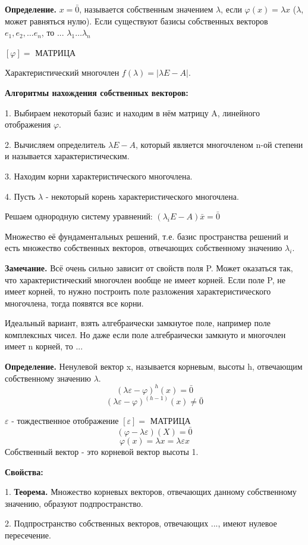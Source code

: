 \documentclass{article}
\begin{document}
{\bf Определение.} $x=\bar{0}$, называется собственным значением $\lambda$, если $\varphi(x)=\lambda x$ ($\lambda$, может равняться нулю). Если существуют базисы собственных векторов $e_1, e_2, \ldots e_n$, то ... $\lambda_1\ldots\lambda_n$

$[\varphi]=$ МАТРИЦА

Характеристический многочлен $f(\lambda)=|\lambda E-A|$.

{\bf Алгоритмы нахождения собственных векторов:}

1. Выбираем некоторый базис и находим в нём матрицу A, линейного отображения $\varphi$.

2. Вычисляем определитель $\lambda E - A$, который является многочленом n-ой степени и называется характеристическим.

3. Находим корни характеристического многочлена.

4. Пусть $\lambda$ - некоторый корень характеристического многочлена.

Решаем однородную систему уравнений: $(\lambda_iE-A)\bar{x}=\bar{0}$

Множество её фундаментальных решений, т.е. базис пространства решений и есть множество собственных векторов, отвечающих собственному значению $\lambda_i$.

{\bf Замечание.} Всё очень сильно зависит от свойств поля P. Может оказаться так, что характеристический многочлен вообще не имеет корней. Если поле P, не имеет корней, то нужно построить поле разложения характеристического многочлена, тогда появятся все корни.

Идеальный вариант, взять алгебраически замкнутое поле, например поле комплексных чисел. Но даже если поле алгебраически замкнуто и многочлен имеет n корней, то ...

{\bf Определение.} Ненулевой вектор x, называется корневым, высоты h, отвечающим собственному значению $\lambda$.
$$(\lambda\varepsilon-\varphi)^h(x)=\bar{0}$$
$$(\lambda\varepsilon-\varphi)^(h-1)(x)\ne\bar{0}$$

$\varepsilon$ - тождественное отображение $[\varepsilon]=$ МАТРИЦА
$$(\varphi-\lambda\varepsilon)(X)=\bar{0}$$
$$\varphi(x)=\lambda x=\lambda\varepsilon x$$
Собственный вектор - это корневой вектор высоты 1.

{\bf Свойства:}

1. {\bf Теорема.} Множество корневых векторов, отвечающих данному собственному значению, образуют подпространство.

2. Подпространство собственных векторов, отвечающих ..., имеют нулевое пересечение.
\end{document}
